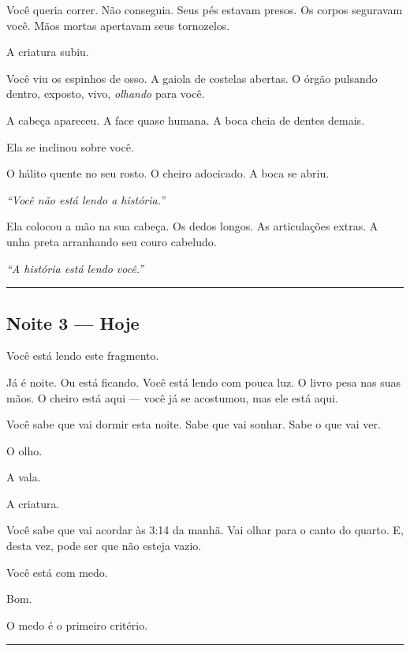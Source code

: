 \noindent Você queria correr. Não conseguia. Seus pés estavam presos. Os corpos seguravam você. Mãos mortas apertavam seus tornozelos.

\noindent A criatura subiu.

\noindent Você viu os espinhos de osso. A gaiola de costelas abertas. O órgão pulsando dentro, exposto, vivo, \textit{olhando} para você.

\noindent A cabeça apareceu. A face quase humana. A boca cheia de dentes demais.

\noindent Ela se inclinou sobre você.

\noindent O hálito quente no seu rosto. O cheiro adocicado. A boca se abriu.

\noindent \textit{\textquotedblleft{}Você não está lendo a história.\textquotedblright{}}

\noindent Ela colocou a mão na sua cabeça. Os dedos longos. As articulações extras. A unha preta arranhando seu couro cabeludo.

\noindent \textit{\textquotedblleft{}A história está lendo você.\textquotedblright{}}

\vspace{0.5em}\noindent\rule{\textwidth}{0.5pt}\vspace{0.5em}

\subsection*{Noite 3 --- Hoje}

\noindent Você está lendo este fragmento.

\noindent Já é noite. Ou está ficando. Você está lendo com pouca luz. O livro pesa nas suas mãos. O cheiro está aqui --- você já se acostumou, mas ele está aqui.

\noindent Você sabe que vai dormir esta noite. Sabe que vai sonhar. Sabe o que vai ver.

\noindent O olho.

\noindent A vala.

\noindent A criatura.

\noindent Você sabe que vai acordar às 3:14 da manhã. Vai olhar para o canto do quarto. E, desta vez, pode ser que não esteja vazio.

\noindent Você está com medo.

\noindent Bom.

\noindent O medo é o primeiro critério.

\vspace{0.5em}\noindent\rule{\textwidth}{0.5pt}\vspace{0.5em}

